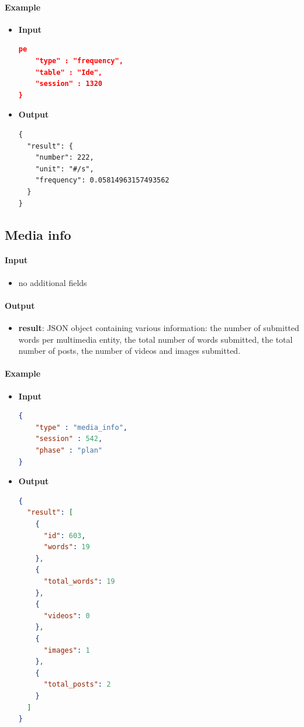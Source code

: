 \documentclass[a4paper,notitlepage,onecolumn]{hitec}  %
\begin{document}
\paragraph{Example}
\begin{itemize}
\item\textbf{Input}
\begin{lstlisting}[language=json,firstnumber=1]
pe
    "type" : "frequency",
    "table" : "Ide",
    "session" : 1320
}
\end{lstlisting}

\item\textbf{Output}
\begin{lstlisting}
{
  "result": {
    "number": 222,
    "unit": "#/s",
    "frequency": 0.05814963157493562
  }
}
\end{lstlisting}
\end{itemize}

\subsection{Media info}

\paragraph{Input}
\begin{itemize}
\item no additional fields
\end{itemize}

\paragraph{Output}
\begin{itemize}
\item\textbf{result}: JSON object containing various information: the number of submitted words per multimedia entity, the total number of words submitted, the total number of posts, the number of videos and images submitted. 
\end{itemize}

\paragraph{Example}
\begin{itemize}
\item\textbf{Input}
\begin{lstlisting}[language=json,firstnumber=1]
{
    "type" : "media_info",
    "session" : 542,
    "phase" : "plan"
}
\end{lstlisting}
\item\textbf{Output}
\begin{lstlisting}[language=json,firstnumber=1]
{
  "result": [
    {
      "id": 603,
      "words": 19
    },
    {
      "total_words": 19
    },
    {
      "videos": 0
    },
    {
      "images": 1
    },
    {
      "total_posts": 2
    }
  ]
}
\end{lstlisting}
\end{itemize}
\end{document}
